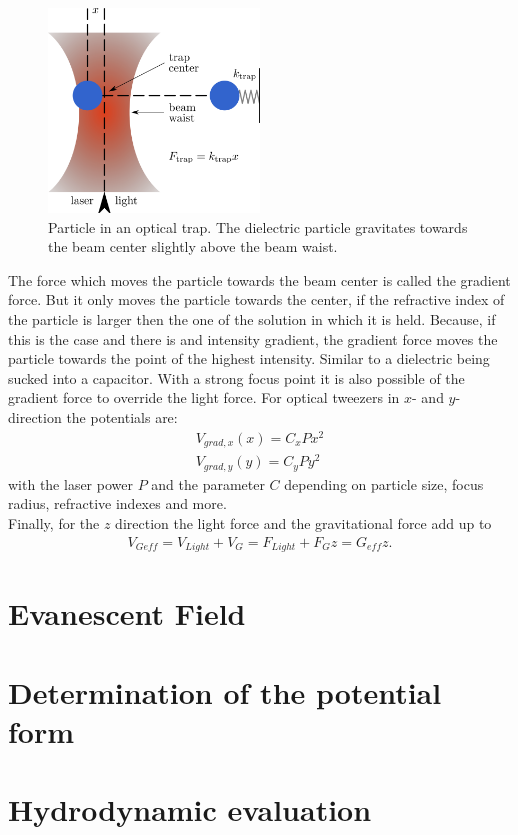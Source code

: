 \documentclass[.../bericht]{subfilies}
\begin{document}
        \begin{figure}[tb]
          \centering
          \includegraphics[width=0.5\textwidth]{figures/opticaltweezer}
          \caption{Particle in an optical trap. The dielectric particle gravitates towards the beam center slightly above the beam waist.  %
           }
           \label{fig:tweezer}
        \end{figure}
        The force which moves the particle towards the beam center is called the gradient force. But it only moves the particle towards the center, if the refractive index of the particle is larger then the one of the solution in which it is held. Because, if this is the case and there is and intensity gradient, the gradient force moves the particle towards the point of the highest intensity. Similar to a dielectric being sucked into a capacitor. With a strong focus point it is also possible of the gradient force to override the light force. For optical tweezers in $x$- and $y$-direction the potentials are:
        \begin{align}
          V_{grad,x}(x)=C_xPx^2\\
          V_{grad,y}(y)=C_yPy^2
        \end{align}
        with the laser power $P$ and the parameter $C$ depending on particle size, focus radius, refractive indexes and more. \\
        Finally, for the $z$ direction the light force and the gravitational force add up to
        \begin{align}
          V_{Geff}=V_{Light}+V_{G}=F_{Light}+F_{G} z= G_{eff} z.
        \end{align}




      \section{Evanescent Field}
      \label{sec:evanenscent}

      \section{Determination of the potential form}
      \label{sec:determination}

      \section{Hydrodynamic evaluation}
      \label{sec:hydrodynamic}
\end{document}
